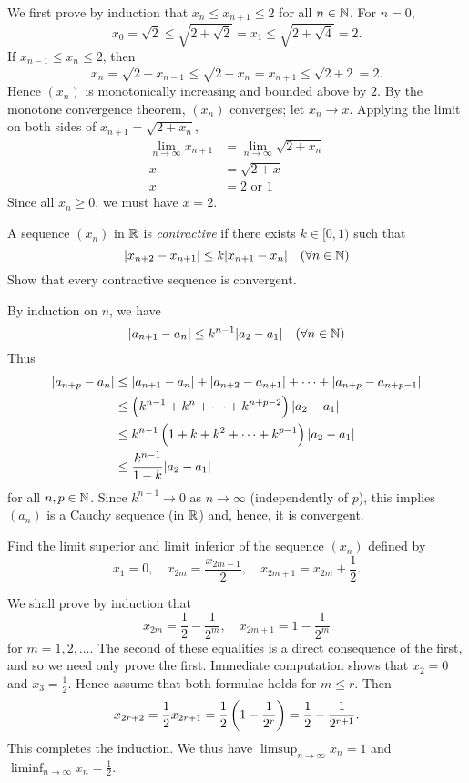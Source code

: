 \begin{solution}
We first prove by induction that $x_n\le x_{n+1}\le 2$ for all $n\in\mathbb N$. For $n=0$,
\[x_0=\sqrt{2}\le\sqrt{2+\sqrt{2}}=x_1\le\sqrt{2+\sqrt{4}}=2.\]
If $x_{n-1}\le x_n\le 2$, then
\[x_n=\sqrt{2+x_{n-1}}\le\sqrt{2+x_n}=x_{n+1}\le\sqrt{2+2}=2.\]
Hence $(x_n)$ is monotonically increasing and bounded above by $2$. By the monotone convergence theorem, $(x_n)$ converges; let $x_n\to x$. Applying the limit on both sides of $x_{n+1}=\sqrt{2+x_n}$,
\begin{align*}
\lim_{n\to\infty}x_{n+1}&=\lim_{n\to\infty}\sqrt{2+x_n}\\
x&=\sqrt{2+x}\\
x&=2\text{ or }1
\end{align*}
Since all $x_n\ge0$, we must have $x=2$.
\end{solution}

\begin{exercise}
A sequence $(x_n)$ in $\mathbb R$ is \emph{contractive} if there exists $k\in[0,1)$ such that
\[|x_{n+2}-x_{n+1}|\le k|x_{n+1}-x_n|\quad(\forall n\in\mathbb N)\]
Show that every contractive sequence is convergent.
\end{exercise}

\begin{solution}
By induction on $n$, we have
\[|a_{n+1}-a_n|\le k^{n-1}|a_2-a_1|\quad(\forall n\in\mathbb N)\]
Thus
\begin{align*}
|a_{n+p}-a_{n}|&\le|a_{n+1}-a_{n}|+|a_{n+2}-a_{n+1}|+\cdots+|a_{n+p}-a_{n+p-1}|\\ 
&\le\left(k^{n-1}+k^{n}+\cdots+k^{n+p-2}\right)|a_{2}-a_{1}|\\ 
&\le k^{n-1}\left(1+k+k^{2}+\cdots+k^{p-1}\right)|a_{2}-a_{1}|\\ 
&\le\frac{k^{n-1}}{1-k}|a_{2}-a_{1}|
\end{align*}
for all $n,p\in\mathbb N$. Since $k^{n-1}\to0$ as $n\to\infty$ (independently of $p$), this implies $(a_n)$ is a Cauchy sequence (in $\mathbb R$) and, hence, it is convergent.
\end{solution}

\begin{exercise}
Find the limit superior and limit inferior of the sequence $(x_n)$ defined by
\[x_1=0,\quad x_{2m}=\frac{x_{2m-1}}{2},\quad x_{2m+1}=x_{2m}+\frac{1}{2}.\]
\end{exercise}

\begin{solution}
We shall prove by induction that
\[x_{2m}=\frac{1}{2}-\frac{1}{2^m},\quad x_{2m+1}=1-\frac{1}{2^m}\]
for $m=1,2,\dots$. The second of these equalities is a direct consequence of the first, and so we need only prove the first. Immediate computation shows that $x_2=0$ and $x_3=\frac{1}{2}$. Hence assume that both formulae holds for $m\le r$. Then
\[x_{2r+2}=\frac{1}{2}x_{2r+1}=\frac{1}{2}\left(1-\frac{1}{2^r}\right)=\frac{1}{2}-\frac{1}{2^{r+1}}.\]
This completes the induction. We thus have $\displaystyle\limsup_{n\to\infty}x_n=1$ and $\displaystyle\liminf_{n\to\infty}x_n=\frac{1}{2}$.
\end{solution}

